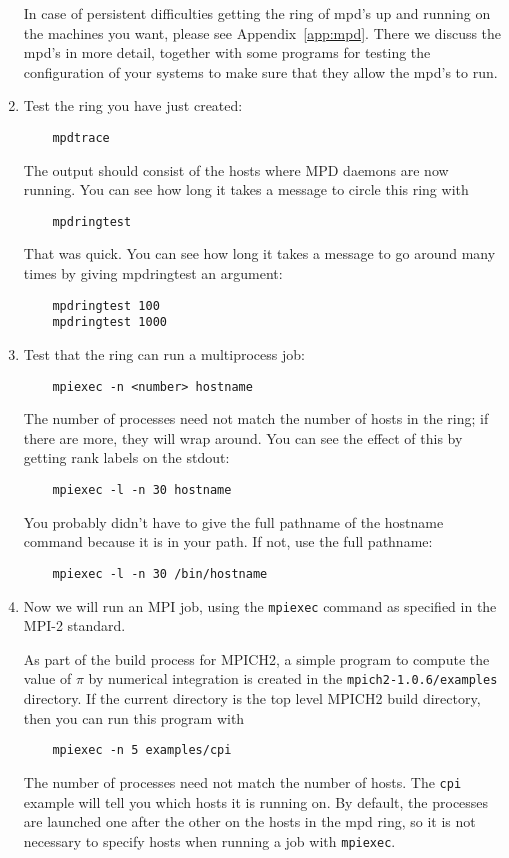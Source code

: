 \documentclass[dvipdfm,11pt]{article}
\begin{document}
\begin{enumerate}
In case of persistent difficulties getting the ring of mpd's up and
running on the machines you want, please see Appendix~\ref{app:mpd}.
There we discuss the mpd's in more detail, together with some programs
for testing the configuration of your systems to make sure that they
allow the mpd's to run.

\item
Test the ring you have just created:
\begin{verbatim}
    mpdtrace
\end{verbatim}
The output should consist of the hosts where MPD daemons are now
running.  You can see how long it takes a message to circle this
ring with 
\begin{verbatim}
    mpdringtest
\end{verbatim}
That was quick.  You can see how long it takes a message to go
around many times by giving mpdringtest an argument:
\begin{verbatim}
    mpdringtest 100
    mpdringtest 1000
\end{verbatim}

\item
Test that the ring can run a multiprocess job:
\begin{verbatim}
    mpiexec -n <number> hostname
\end{verbatim}
The number of processes need not match the number of hosts in the
ring;  if there are more, they will wrap around.  You can see the
effect of this by getting rank labels on the stdout:
\begin{verbatim}
    mpiexec -l -n 30 hostname
\end{verbatim}
You probably didn't have to give the full pathname of the hostname
command because it is in your path.  If not, use the full pathname:
\begin{verbatim}
    mpiexec -l -n 30 /bin/hostname
\end{verbatim}

\item
Now we will run an MPI job, using the \texttt{mpiexec} command as specified
in the MPI-2 standard.  

As part of the build process for MPICH2, a simple program to compute the value
of $\pi$ by numerical integration is created in the
\texttt{mpich2-1.0.6/examples} directory.  If the current directory is the top
level MPICH2 build directory, then you can run this program with
\begin{verbatim}
    mpiexec -n 5 examples/cpi
\end{verbatim}
The number of processes need not match the number of hosts.
The \texttt{cpi} example will tell you which hosts it is running on.
By default, the processes are launched one after the other on the hosts
in the mpd ring, so it is not necessary to specify hosts when running a
job with \texttt{mpiexec}.


\end{enumerate}
\end{document}

